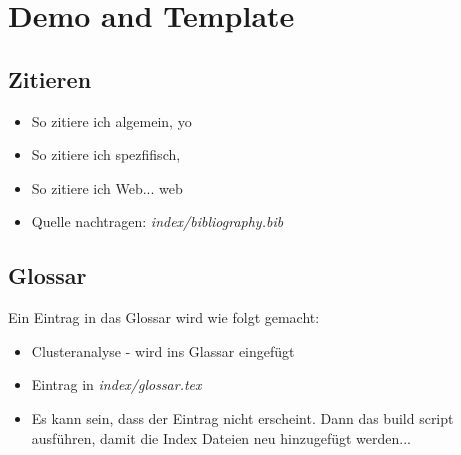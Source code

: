 \chapter{Demo and Template}
\section{Zitieren}
\begin{itemize}
	\item{So zitiere ich algemein, \cite{lin1973} yo}
	\item{So zitiere ich spezfifisch, \cite[S. 15]{lin1973}}
	\item{So zitiere ich Web... web \cite{learnHaskell}}
	\item{Quelle nachtragen: \textit{index/bibliography.bib}}
\end{itemize}


\section{Glossar}
Ein Eintrag in das Glossar wird wie folgt gemacht:
\begin{itemize}
	\item{\Gls{Clusteranalyse} - wird ins Glassar eingefügt}
	\item{Eintrag in \textit{index/glossar.tex}}
	\item{Es kann sein, dass der Eintrag nicht erscheint. Dann das build script ausführen, damit die Index Dateien neu hinzugefügt werden...}
\end{itemize}